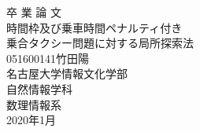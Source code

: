 \documentclass[uplatex]{ujreport}
\begin{document}
\begin{table}[b]
\begin{center}
{\huge 卒\hspace{0.1cm} 業\hspace{0.1cm} 論\hspace{0.1cm} 文}\\[2.5cm]
{\huge 時間枠及び乗車時間ペナルティ付き\\乗合タクシー問題に対する局所探索法}\\[6cm]
{\huge 051600141\qquad 竹田陽}\\[1cm]
{\huge 名古屋大学情報文化学部}\\[0.5cm]
{\huge 自然情報学科}\\[0.5cm]
{\huge 数理情報系}\\[0.5cm]
{\huge 2020年1月}\\
\end{center}
\end{table}


\thispagestyle{empty}
\clearpage
\newpage
{}
\setcounter{page}{1}







\thispagestyle{empty}
\tableofcontents
\newpage
\setcounter{page}{1}
\pagestyle{plain}








% 



\end{document}
